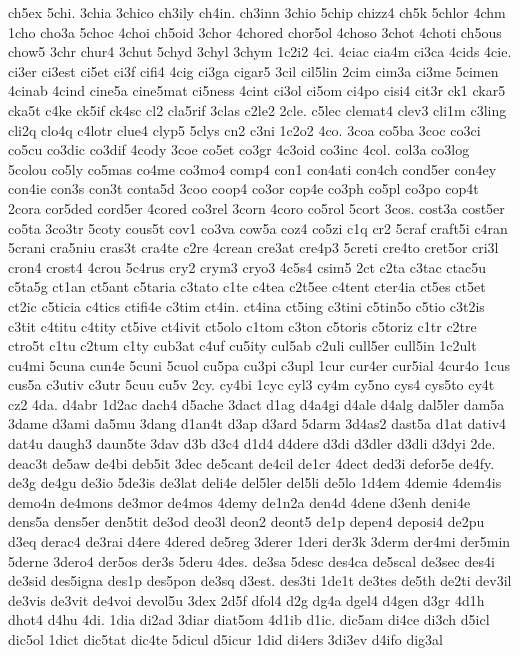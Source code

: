 {ch5ex
5chi.
3chia
3chico
ch3ily
ch4in.
ch3inn
3chio
5chip
chizz4
ch5k
5chlor
4chm
1cho
cho3a
5choc
4choi
ch5oid
3chor
4chored
chor5ol
4choso
3chot
4choti
ch5ous
chow5
3chr
chur4
3chut
5chyd
3chyl
3chym
1c2i2
4ci.
4ciac
cia4m
ci3ca
4cids
4cie.
ci3er
ci3est
ci5et
ci3f
cifi4
4cig
ci3ga
cigar5
3cil
cil5lin
2cim
cim3a
ci3me
5cimen
4cinab
4cind
cine5a
cine5mat
ci5ness
4cint
ci3ol
ci5om
ci4po
cisi4
cit3r
ck1
ckar5
cka5t
c4ke
ck5if
ck4sc
cl2
cla5rif
3clas
c2le2
2cle.
c5lec
clemat4
clev3
cli1m
c3ling
cli2q
clo4q
c4lotr
clue4
clyp5
5clys
cn2
c3ni
1c2o2
4co.
3coa
co5ba
3coc
co3ci
co5cu
co3dic
co3dif
4cody
3coe
co5et
co3gr
4c3oid
co3inc
4col.
col3a
co3log
5colou
co5ly
co5mas
co4me
co3mo4
comp4
con1
con4ati
con4ch
cond5er
con4ey
con4ie
con3s
con3t
conta5d
3coo
coop4
co3or
cop4e
co3ph
co5pl
co3po
cop4t
2cora
cor5ded
cord5er
4cored
co3rel
3corn
4coro
co5rol
5cort
3cos.
cost3a
cost5er
co5ta
3co3tr
5coty
cous5t
cov1
co3va
cow5a
coz4
co5zi
c1q
cr2
5craf
craft5i
c4ran
5crani
cra5niu
cras3t
cra4te
c2re
4crean
cre3at
cre4p3
5creti
cre4to
cret5or
cri3l
cron4
crost4
4crou
5c4rus
cry2
crym3
cryo3
4c5s4
csim5
2ct
c2ta
c3tac
ctac5u
c5ta5g
ct1an
ct5ant
c5taria
c3tato
c1te
c4tea
c2t5ee
c4tent
cter4ia
ct5es
ct5et
ct2ic
c5ticia
c4tics
ctifi4e
c3tim
ct4in.
ct4ina
ct5ing
c3tini
c5tin5o
c5tio
c3t2is
c3tit
c4titu
c4tity
ct5ive
ct4ivit
ct5olo
c1tom
c3ton
c5toris
c5toriz
c1tr
c2tre
ctro5t
c1tu
c2tum
c1ty
cub3at
c4uf
cu5ity
cul5ab
c2uli
cull5er
cull5in
1c2ult
cu4mi
5cuna
cun4e
5cuni
5cuol
cu5pa
cu3pi
c3upl
1cur
cur4er
cur5ial
4cur4o
1cus
cus5a
c3utiv
c3utr
5cuu
cu5v
2cy.
cy4bi
1cyc
cyl3
cy4m
cy5no
cys4
cys5to
cy4t
cz2
4da.
d4abr
1d2ac
dach4
d5ache
3dact
d1ag
d4a4gi
d4ale
d4alg
dal5ler
dam5a
3dame
d3ami
da5mu
3dang
d1an4t
d3ap
d3ard
5darm
3d4as2
dast5a
d1at
dativ4
dat4u
daugh3
daun5te
3dav
d3b
d3c4
d1d4
d4dere
d3di
d3dler
d3dli
d3dyi
2de.
deac3t
de5aw
de4bi
deb5it
3dec
de5cant
de4cil
de1cr
4dect
ded3i
defor5e
de4fy.
de3g
de4gu
de3io
5de3is
de3lat
deli4e
del5ler
del5li
de5lo
1d4em
4demie
4dem4is
demo4n
de4mons
de3mor
de4mos
4demy
de1n2a
den4d
4dene
d3enh
deni4e
dens5a
dens5er
den5tit
de3od
deo3l
deon2
deont5
de1p
depen4
deposi4
de2pu
d3eq
derac4
de3rai
d4ere
4dered
de5reg
3derer
1deri
der3k
3derm
der4mi
der5min
5derne
3dero4
der5os
der3s
5deru
4des.
de3sa
5desc
des4ca
de5scal
de3sec
des4i
de3sid
des5igna
des1p
des5pon
de3sq
d3est.
des3ti
1de1t
de3tes
de5th
de2ti
dev3il
de3vis
de3vit
de4voi
devol5u
3dex
2d5f
dfol4
d2g
dg4a
dgel4
d4gen
d3gr
4d1h
dhot4
d4hu
4di.
1dia
di2ad
3diar
diat5om
4d1ib
d1ic.
dic5am
di4ce
di3ch
d5icl
dic5ol
1dict
dic5tat
dic4te
5dicul
d5icur
1did
di4ers
3di3ev
d4ifo
dig3al
}
